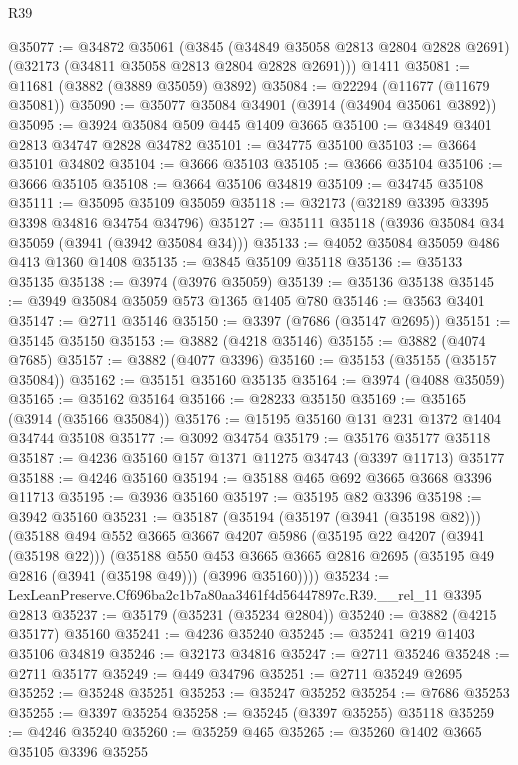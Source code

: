 \begin{lexlean}{R39}
\begin{coremodule}
@35077 := @34872
    @35061
    (@3845 (@34849 @35058 @2813 @2804 @2828 @2691) (@32173 (@34811 @35058 @2813 @2804 @2828 @2691)))
    @1411
@35081 := @11681 (@3882 (@3889 @35059) @3892)
@35084 := @22294 (@11677 (@11679 @35081))
@35090 := @35077 @35084 @34901 (@3914 (@34904 @35061 @3892))
@35095 := @3924 @35084 @509 @445 @1409 @3665
@35100 := @34849 @3401 @2813 @34747 @2828 @34782
@35101 := @34775 @35100
@35103 := @3664 @35101 @34802
@35104 := @3666 @35103
@35105 := @3666 @35104
@35106 := @3666 @35105
@35108 := @3664 @35106 @34819
@35109 := @34745 @35108
@35111 := @35095 @35109 @35059
@35118 := @32173 (@32189 @3395 @3395 @3398 @34816 @34754 @34796)
@35127 := @35111 @35118 (@3936 @35084 @34 @35059 (@3941 (@3942 @35084 @34)))
@35133 := @4052 @35084 @35059 @486 @413 @1360 @1408
@35135 := @3845 @35109 @35118
@35136 := @35133 @35135
@35138 := @3974 (@3976 @35059)
@35139 := @35136 @35138
@35145 := @3949 @35084 @35059 @573 @1365 @1405 @780
@35146 := @3563 @3401
@35147 := @2711 @35146
@35150 := @3397 (@7686 (@35147 @2695))
@35151 := @35145 @35150
@35153 := @3882 (@4218 @35146)
@35155 := @3882 (@4074 @7685)
@35157 := @3882 (@4077 @3396)
@35160 := @35153 (@35155 (@35157 @35084))
@35162 := @35151 @35160 @35135
@35164 := @3974 (@4088 @35059)
@35165 := @35162 @35164
@35166 := @28233 @35150
@35169 := @35165 (@3914 (@35166 @35084))
@35176 := @15195 @35160 @131 @231 @1372 @1404 @34744 @35108
@35177 := @3092 @34754
@35179 := @35176 @35177 @35118
@35187 := @4236 @35160 @157 @1371 @11275 @34743 (@3397 @11713) @35177
@35188 := @4246 @35160
@35194 := @35188 @465 @692 @3665 @3668 @3396 @11713
@35195 := @3936 @35160
@35197 := @35195 @82 @3396
@35198 := @3942 @35160
@35231 := @35187
    (@35194
      (@35197 (@3941 (@35198 @82)))
      (@35188
        @494
        @552
        @3665
        @3667
        @4207
        @5986
        (@35195 @22 @4207 (@3941 (@35198 @22)))
        (@35188
          @550
          @453
          @3665
          @3665
          @2816
          @2695
          (@35195 @49 @2816 (@3941 (@35198 @49)))
          (@3996 @35160))))
@35234 := LexLeanPreserve.Cf696ba2c1b7a80aa3461f4d56447897c.R39.__rel_11 @3395 @2813
@35237 := @35179 (@35231 (@35234 @2804))
@35240 := @3882 (@4215 @35177) @35160
@35241 := @4236 @35240
@35245 := @35241 @219 @1403 @35106 @34819
@35246 := @32173 @34816
@35247 := @2711 @35246
@35248 := @2711 @35177
@35249 := @449 @34796
@35251 := @2711 @35249 @2695
@35252 := @35248 @35251
@35253 := @35247 @35252
@35254 := @7686 @35253
@35255 := @3397 @35254
@35258 := @35245 (@3397 @35255) @35118
@35259 := @4246 @35240
@35260 := @35259 @465
@35265 := @35260 @1402 @3665 @35105 @3396 @35255

\end{coremodule}
\end{lexlean}
